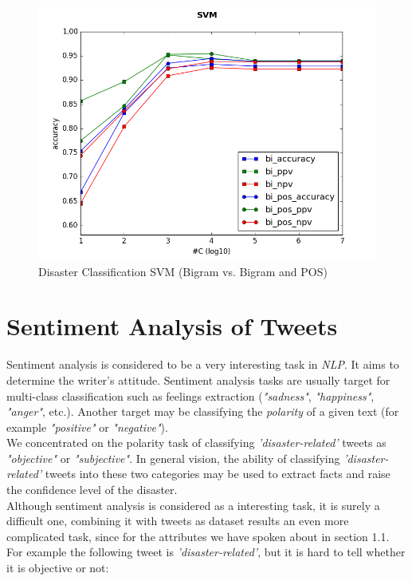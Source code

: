 \documentclass[letterpaper,twocolumn,10pt]{article}
\begin{document}
\begin{figure}[H]
	\centering
	\includegraphics[width=\columnwidth]{../graphs/DisasterClassification/svm_bi_features.png}
	\caption{Disaster Classification SVM (Bigram vs. Bigram and POS)}
	\label{fig:disaster_classification_svm_bi}
\end{figure}

\section{Sentiment Analysis of Tweets}

Sentiment analysis is considered to be a very interesting task in \textit{NLP}. It aims to determine the writer's attitude. Sentiment analysis tasks are usually target for multi-class classification such as feelings extraction (\textit{"sadness"}, \textit{"happiness"}, \textit{"anger"}, etc.). Another target may be classifying the \textit{polarity} of a given text (for example \textit{"positive"} or \textit{"negative"}). \\
We concentrated on the polarity task of classifying \textit{'disaster-related'} tweets as \textit{"objective"} or \textit{"subjective"}. In general vision, the ability of classifying \textit{'disaster-related'} tweets into these two categories may be used to extract facts and raise the confidence level of the disaster. \\
Although sentiment analysis is considered as a interesting task, it is surely a difficult one, combining it with tweets as dataset results an even more complicated task, since for the attributes we have spoken about in section 1.1. For example the following tweet is \textit{'disaster-related'}, but it is hard to tell whether it is objective or not:
\begin{center}
	\parbox{190pt}{}
\end{center}
\end{document}
